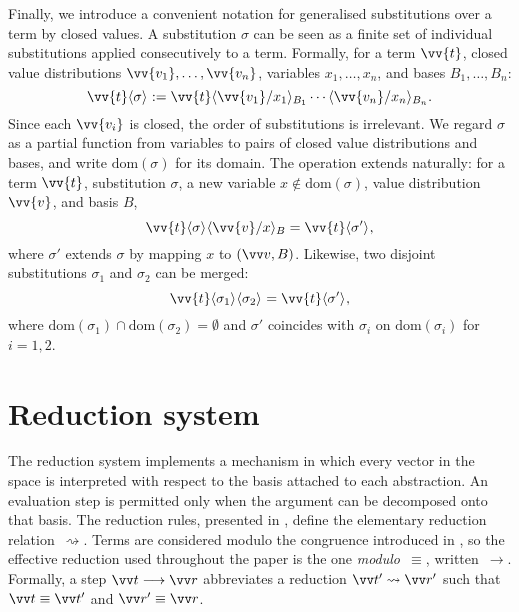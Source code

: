 \documentclass[runningheads,orivec,envcountsame,envcountsect]{llncs}
\newcommand\lra{\longrightarrow}
\newcommand\ansubst[2]{\ensuremath{\langle #1 \rangle_{#2}}}
\newcommand\dom[1]{\mathrm{dom}(#1)}
\def\lraneq{\rightsquigarrow}
\begin{document}
Finally, we introduce a convenient notation for generalised substitutions over
a term by closed values. A substitution $\sigma$ can be seen as a finite set of
individual substitutions applied consecutively to a term. Formally, for a term
$\vv{t}$, closed value distributions $\vv{v_1},\dots,\vv{v_n}$, variables
$x_1,\dots,x_n$, and bases $B_1,\dots,B_n$:
\[
  \vv{t}\ansubst{\sigma}{}
  := \vv{t}\ansubst{\vv{v_1}/x_1}{B_1}\dotsb\ansubst{\vv{v_n}/x_n}{B_n}.
\]
Since each $\vv{v_i}$ is closed, the order of substitutions is irrelevant. We
regard $\sigma$ as a partial function from variables to pairs of closed value
distributions and bases, and write $\dom{\sigma}$ for its domain. The operation
extends naturally: for a term $\vv{t}$, substitution $\sigma$, a new variable
$x\notin\dom{\sigma}$, value distribution $\vv{v}$, and basis $B$,
\[
  \vv{t}\ansubst{\sigma}{}\ansubst{\vv{v}/x}{B}
  = \vv{t}\ansubst{\sigma'}{},
\]
where $\sigma'$ extends $\sigma$ by mapping $x$ to $(\vv v,B)$. Likewise, two
disjoint substitutions $\sigma_1$ and $\sigma_2$ can be merged:
\[
  \vv{t}\ansubst{\sigma_1}{}\ansubst{\sigma_2}{}
  = \vv{t}\ansubst{\sigma'}{},
\]
where $\dom{\sigma_1}\cap\dom{\sigma_2}=\emptyset$ and $\sigma'$ coincides with
$\sigma_i$ on $\dom{\sigma_i}$ for $i=1,2$.


\section{Reduction system}\label{sec:reduction}

The reduction system implements a mechanism in which every vector in the space
is interpreted with respect to the basis attached to each abstraction. An
evaluation step is permitted only when the argument can be decomposed onto that
basis. The reduction rules, presented in
, define the elementary
reduction relation~$\lraneq$. Terms are considered modulo the congruence
introduced in , so the
effective reduction used throughout the paper is the one
\emph{modulo~$\equiv$}, written~$\lra$.  Formally, a step $\vv t\lra\vv r$
abbreviates a reduction $\vv t'\lraneq\vv r'$ such that $\vv t\equiv\vv t'$
and $\vv r'\equiv\vv r$.
\end{document}

